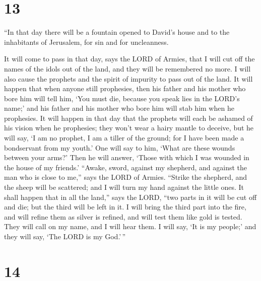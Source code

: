 \hypertarget{section-12}{%
\section{13}\label{section-12}}

 ``In that day there will be a fountain opened to David's
house and to the inhabitants of Jerusalem, for sin and for uncleanness.

 It will come to pass in that day, says the LORD of
Armies, that I will cut off the names of the idols out of the land, and
they will be remembered no more. I will also cause the prophets and the
spirit of impurity to pass out of the land.  It will
happen that when anyone still prophesies, then his father and his mother
who bore him will tell him, `You must die, because you speak lies in the
LORD's name;' and his father and his mother who bore him will stab him
when he prophesies.  It will happen in that day that the
prophets will each be ashamed of his vision when he prophesies; they
won't wear a hairy mantle to deceive,  but he will say, `I
am no prophet, I am a tiller of the ground; for I have been made a
bondservant from my youth.'  One will say to him, `What
are these wounds between your arms?' Then he will answer, `Those with
which I was wounded in the house of my friends.'  ``Awake,
sword, against my shepherd, and against the man who is close to me,''
says the LORD of Armies. ``Strike the shepherd, and the sheep will be
scattered; and I will turn my hand against the little ones.
 It shall happen that in all the land,'' says the LORD,
``two parts in it will be cut off and die; but the third will be left in
it.  I will bring the third part into the fire, and will
refine them as silver is refined, and will test them like gold is
tested. They will call on my name, and I will hear them. I will say, `It
is my people;' and they will say, `The LORD is my God.'\,''

\hypertarget{section-13}{%
\section{14}\label{section-13}}

